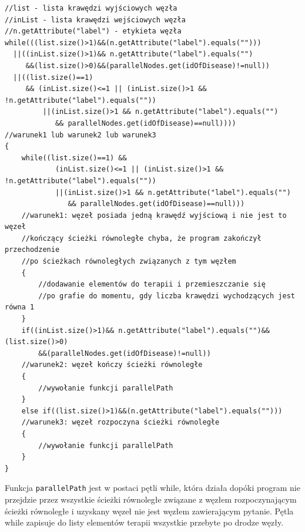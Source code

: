 
\newpage
\begin{verbatim}
//list - lista krawędzi wyjściowych węzła
//inList - lista krawędzi wejściowych węzła
//n.getAttribute("label") - etykieta węzła
while(((list.size()>1)&&(n.getAttribute("label").equals("")))
  ||((inList.size()>1)&& n.getAttribute("label").equals("")
     &&(list.size()>0)&&(parallelNodes.get(idOfDisease)!=null))
  ||((list.size()==1) 
     && (inList.size()<=1 || (inList.size()>1 && !n.getAttribute("label").equals(""))
 	     ||(inList.size()>1 && n.getAttribute("label").equals("")
	        && parallelNodes.get(idOfDisease)==null))))
//warunek1 lub warunek2 lub warunek3
{
    while((list.size()==1) && 
    		(inList.size()<=1 || (inList.size()>1 && !n.getAttribute("label").equals(""))
    		||(inList.size()>1 && n.getAttribute("label").equals("") 
    		   && parallelNodes.get(idOfDisease)==null)))
    //warunek1: węzeł posiada jedną krawędź wyjściową i nie jest to węzeł 
    //kończący ścieżki równoległe chyba, że program zakończył przechodzenie 
    //po ścieżkach równoległych związanych z tym węzłem
    {
    	//dodawanie elementów do terapii i przemieszczanie się 
    	//po grafie do momentu, gdy liczba krawędzi wychodzących jest równa 1
    }
    if((inList.size()>1)&& n.getAttribute("label").equals("")&&(list.size()>0)
        &&(parallelNodes.get(idOfDisease)!=null))
    //warunek2: węzeł kończy ścieżki równoległe
    {
        //wywołanie funkcji parallelPath
    }
    else if((list.size()>1)&&(n.getAttribute("label").equals("")))
    //warunek3: węzeł rozpoczyna ścieżki równoległe
    {
        //wywołanie funkcji parallelPath
    }
}
\end{verbatim}
\newpage
Funkcja \texttt{parallelPath} jest w postaci pętli while, która działa dopóki program nie przejdzie przez wszystkie ścieżki równoległe związane z węzłem rozpoczynającym ścieżki równoległe i uzyskany węzeł nie jest węzłem zawierającym pytanie. Pętla while zapisuje do listy elementów terapii wszystkie przebyte po drodze węzły. 

